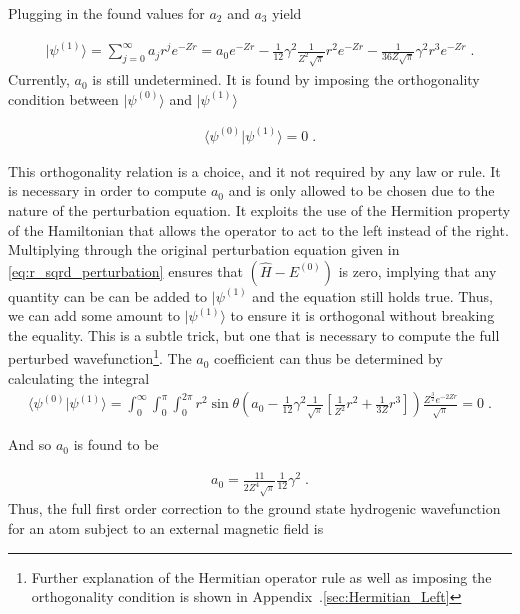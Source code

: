         \noindent Plugging in the found values for $a_2$ and $a_3$ yield 

        \begin{align}
            \vert \psi^{(1)} \rangle = \sum_{j = 0}^\infty a_j r^j e^{-Zr} = a_0 e^{-Zr} -\frac{1}{12} \gamma^2 \frac{1}{Z^2 \sqrt{\pi}} r^2 e^{-Zr} -\frac{1}{36Z\sqrt{\pi}} \gamma^2 r^3 e^{-Zr}\;.
        \end{align}
        Currently, $a_0$ is still undetermined. It is found by imposing the orthogonality condition between $\vert \psi^{(0)} \rangle$ and $\vert \psi^{(1)} \rangle$

        \begin{align}
            \langle \psi^{(0)} \vert \psi^{(1)} \rangle = 0\;.
        \end{align}

        This orthogonality relation is a choice, and it not required by any law or rule. It is necessary in order to compute $a_0$ and is only allowed to be chosen due to the nature of the perturbation equation. It exploits the use of the Hermition property of the Hamiltonian that allows the operator to act to the left instead of the right. Multiplying through the original perturbation equation given in \eqref{eq:r_sqrd_perturbation} ensures that $\left(\hat{H} - E^{(0)} \right)$ is zero, implying that any quantity can be can be added to $\vert \psi^{(1)}$ and the equation still holds true. Thus, we can add some amount to $\vert \psi^{(1)} \rangle$ to ensure it is orthogonal without breaking the equality. This is a subtle trick, but one that is necessary to compute the full perturbed wavefunction\footnote{Further explanation of the Hermitian operator rule as well as imposing the orthogonality condition is shown in Appendix~.\ref{sec:Hermitian_Left}}. The $a_0$ coefficient can thus be determined by calculating the integral 
        \small
        \begin{align}
            \langle \psi^{(0)} \vert \psi^{(1)} \rangle = \int_0^\infty \int_0^\pi \int_0^{2\pi} r^2 \sin \theta \left(a_0 -\frac{1}{12} \gamma^2 \frac{1}{\sqrt{\pi}} \left[\frac{1}{Z^2} r^2 +\frac{1}{3Z} r^3\right] \right) \frac{Z^{\frac{3}{2}} e^{-2Zr}}{\sqrt{\pi}} = 0\;.
        \end{align}
        \normalsize

        \noindent And so $a_0$ is found to be 

        \begin{align}
            a_0 = \frac{11}{2 Z^4 \sqrt{\pi}} \frac{1}{12}\gamma^2 \;.
        \end{align}
        \noindent Thus, the full first order correction to the ground state hydrogenic wavefunction for an atom subject to an external magnetic field is 

